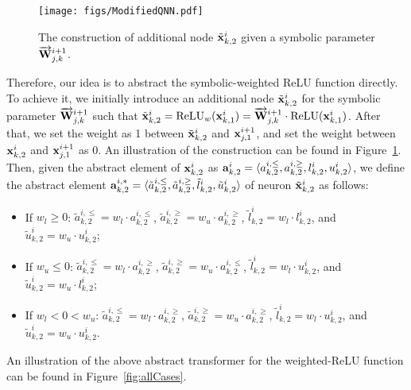 \begin{figure*}
    \centering
    \texttt{[image: figs/ModifiedQNN.pdf]}
    \caption{The construction of additional node $\tilde{{\mathbf{x}}}^{i}_{k,2}$ given a symbolic parameter $\overrightarrow{{\mathbf{W}}}^{i+1}_{j,k}$.}
    \label{fig:modQNN}
\end{figure*}

Therefore, our idea is to abstract the symbolic-weighted ReLU function directly. To achieve it, we initially introduce an additional node $\tilde{{\mathbf{x}}}^{i}_{k,2}$ for the symbolic parameter $\overrightarrow{{\mathbf{W}}}^{i+1}_{j,k}$ such that $\tilde{{\mathbf{x}}}^i_{k,2}=\text{ReLU}_w({\mathbf{x}}^{i}_{k,1}) = \overrightarrow{{\mathbf{W}}}^{i+1}_{j,k} \cdot \text{ReLU}({\mathbf{x}}^{i}_{k,1})$. After that, we set the weight as 1 between $\tilde{{\mathbf{x}}}^i_{k,2}$ and ${\mathbf{x}}^{i+1}_{j,1}$, and set the weight between ${\mathbf{x}}^i_{k,2}$ and ${\mathbf{x}}^{i+1}_{j,1}$ as 0. An illustration of the construction can be found in Figure~\ref{fig:modQNN}.
Then, given the abstract element of ${\mathbf{x}}^i_{k,2}$ as ${\mathbf{a}}^{i}_{k,2}=\langle a^{i,\le}_{k,2}, a^{i,\ge}_{k,2}, l^i_{k,2}, u^i_{k,2} \rangle$, we define the abstract element ${\mathbf{a}}^{i,\ast}_{k,2}=\langle \tilde{a}^{i,\le}_{k,2},\tilde{a}^{i,\ge}_{k,2}, \tilde{l}^i_{k,2}, \tilde{u}^i_{k,2} \rangle$ of neuron $\tilde{{\mathbf{x}}}^i_{k,2}$ as follows:
\begin{itemize}
    \item If $w_l\ge 0$: $\tilde{a}^{i,\le}_{k,2}=w_l\cdot a^{i,\le}_{k,2}$, $\tilde{a}^{i,\ge}_{k,2}=w_u\cdot a^{i,\ge}_{k,2}$, $\tilde{l}^i_{k,2}=w_l\cdot l^i_{k,2}$, and $\tilde{u}^i_{k,2}=w_u\cdot u^i_{k,2}$;
    
    \item If $w_u\le 0$: $\tilde{a}^{i,\le}_{k,2}=w_l\cdot a^{i,\ge}_{k,2}$, $\tilde{a}^{i,\ge}_{k,2}=w_u\cdot a^{i,\le}_{k,2}$, $\tilde{l}^i_{k,2}=w_l\cdot u^i_{k,2}$, and $\tilde{u}^i_{k,2}=w_u\cdot l^i_{k,2}$;
    
    \item If $w_l < 0 < w_u$: $\tilde{a}^{i,\le}_{k,2}=w_l\cdot a^{i,\ge}_{k,2}$, $\tilde{a}^{i,\ge}_{k,2}=w_u\cdot a^{i,\ge}_{k,2}$, $\tilde{l}^i_{k,2}=w_l\cdot u^i_{k,2}$, and $\tilde{u}^i_{k,2}=w_u\cdot u^i_{k,2}$.
\end{itemize}

An illustration of the above abstract transformer for the weighted-ReLU function can be found in Figure~\ref{fig:allCases}.

